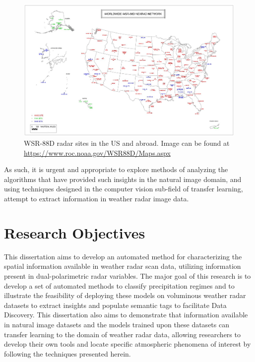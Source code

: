 \begin{figure}[h]
	\centering
	\includegraphics[width=\textwidth]{./thesis_code/plots/noaa_wsr88d_map.jpg}
	\caption{WSR-88D radar sites in the US and abroad. Image can be found at \url{https://www.roc.noaa.gov/WSR88D/Maps.aspx}}
	\label{fig:introduction_wsr88d-map}
\end{figure}

As such, it is urgent and appropriate to explore methods of analyzing the algorithms that have provided such insights in the natural image domain, and using techniques designed in the computer vision sub-field of transfer learning, attempt to extract information in weather radar image data.

\section{Research Objectives}
\label{sec:introduction_objectives}

This dissertation aims to develop an automated method for characterizing the spatial information available in weather radar scan data, utilizing information present in dual-polarimetric radar variables.
The major goal of this research is to develop a set of automated methods to classify precipitation regimes and to illustrate the feasibility of deploying these models on voluminous weather radar datasets to extract insights and populate semantic tags to facilitate Data Discovery.
This dissertation also aims to demonstrate that information available in natural image datasets and the models trained upon these datasets can transfer learning to the domain of weather radar data, allowing researchers to develop their own tools and locate specific atmospheric phenomena of interest by following the techniques presented herein.

